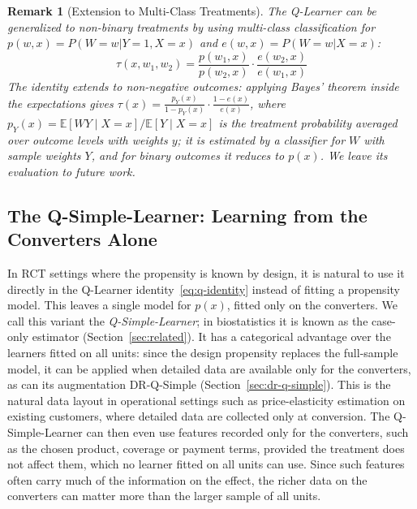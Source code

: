 \documentclass{article}
\newtheorem{remark}{Remark}
\begin{document}
\begin{remark}[Extension to Multi-Class Treatments]
The Q-Learner can be generalized to non-binary treatments by using
multi-class classification for $p(w, x) = P(W{=}w|Y{=}1, X{=}x)$ and
$e(w, x) = P(W{=}w|X{=}x)$:
\begin{equation}
    \tau(x, w_1, w_2) = \frac{p(w_1, x)}{p(w_2, x)} \cdot
    \frac{e(w_2, x)}{e(w_1, x)}
\end{equation}
The identity extends to non-negative outcomes: applying Bayes' theorem
inside the expectations gives
$\tau(x)=\frac{p_Y(x)}{1-p_Y(x)}\cdot\frac{1-e(x)}{e(x)}$, where
$p_Y(x)=\mathbb{E}[WY\mid X{=}x]/\mathbb{E}[Y\mid X{=}x]$ is the treatment
probability averaged over outcome levels with weights $y$; it is
estimated by a classifier for $W$ with sample weights $Y$, and for binary
outcomes it reduces to $p(x)$. We leave its evaluation to future work.
\end{remark}

\subsection{The Q-Simple-Learner: Learning from the Converters Alone}
\label{sec:q-simple}

In RCT settings where the propensity is known by design, it is natural
to use it directly in the Q-Learner identity~\eqref{eq:q-identity}
instead of fitting a propensity model. This leaves a single model for
$p(x)$, fitted only on the converters. We call this variant the
\emph{Q-Simple-Learner}; in biostatistics it is known as the case-only
estimator (Section~\ref{sec:related}). It has a categorical advantage over the
learners fitted on all units: since the design propensity replaces the
full-sample model, it can be applied when detailed data are available only
for the converters, as can its augmentation DR-Q-Simple
(Section~\ref{sec:dr-q-simple}). This is the natural data
layout in operational settings such as price-elasticity estimation on
existing customers, where detailed data are collected only at conversion.
The Q-Simple-Learner can then even use features recorded
only for the converters, such as the chosen product, coverage or payment
terms, provided the treatment does not affect them, which no learner fitted
on all units can use. Since such features
often carry much of the information on the effect, the richer data on the
converters can matter more than the larger sample of all units.
\end{document}

